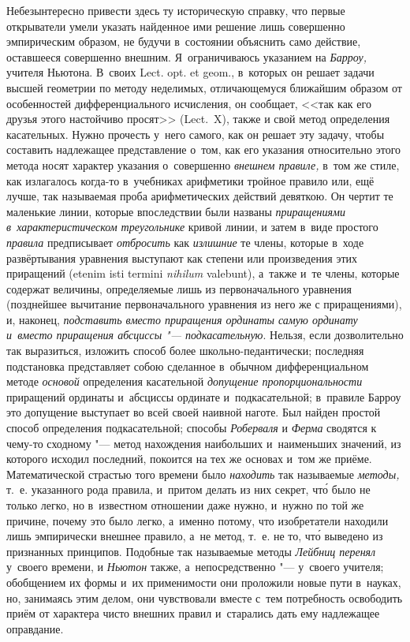 Небезынтересно привести здесь ту историческую справку, что первые открыватели
умели указать найденное ими решение лишь совершенно эмпирическим образом, не
будучи в~состоянии объяснить само действие, оставшееся совершенно внешним.
Я~ограничиваюсь указанием на {\em Барроу,} учителя Ньютона. В~своих Lect. opt.
et geom., в~которых он решает задачи высшей геометрии по методу неделимых,
отличающемуся ближайшим образом от особенностей дифференциального исчисления,
он сообщает, <<так как его друзья этого настойчиво просят>> (Lect.~X), также и
свой метод определения касательных. Нужно прочесть у~него самого, как он решает
эту задачу, чтобы составить надлежащее представление о~том, как его указания
относительно этого метода носят характер указания о~совершенно {\em внешнем
правиле,} в~том же стиле, как излагалось когда-то в~учебниках арифметики
тройное правило или, ещё лучше, так называемая проба арифметических действий
девяткою. Он чертит те маленькие линии, которые впоследствии были
названы {\em приращениями в~характеристическом треугольнике} кривой линии, и
затем в~виде простого {\em правила} предписывает {\em отбросить} как
{\em излишние} те члены, которые в~ходе развёртывания уравнения выступают как
степени или произведения этих приращений (etenim isti termini {\em nihilum}
vale\-bunt), а~также
и~те члены, которые содержат величины, определяемые лишь из первоначального
уравнения (позднейшее вычитание первоначального уравнения из него же с
приращениями), и, наконец, {\em подставить вместо приращения ординаты самую
ординату и~вместо приращения абсциссы "--- подкасательную}. Нельзя, если
дозволительно так выразиться, изложить способ более школьно-педантически;
последняя подстановка представляет собою сделанное в~обычном дифференциальном
методе {\em основой} определения касательной {\em допущение пропорциональности}
приращений ординаты и~абсциссы ординате и~подкасательной; в~правиле Барроу это
допущение выступает во всей своей наивной наготе. Был найден простой способ
определения подкасательной; способы {\em Роберваля} и {\em Ферма} сводятся к
чему-то сходному "--- метод нахождения наибольших и~наименьших значений, из
которого исходил последний, покоится на тех же основах и~том же приёме.
Математической страстью того времени было {\em находить} так называемые
{\em методы,} т.~е. указанного рода правила, и~притом делать из них секрет,
чт\'{о} было не только легко, но в~известном отношении даже нужно, и~нужно по
той же причине, почему это было легко, а~именно потому, что изобретатели
находили лишь эмпирически внешнее правило, а~не метод, т.~е. не то, чт\'{о}
выведено из признанных принципов. Подобные так называемые методы
{\em Лейбниц перенял} у~своего времени, и {\em Ньютон} также,
а~непосредственно "--- у~своего учителя; обобщением их
формы и~их применимости они проложили новые пути в~науках, но, занимаясь этим
делом, они чувствовали вместе с~тем потребность освободить приём от характера
чисто внешних правил и~старались дать ему надлежащее оправдание.

